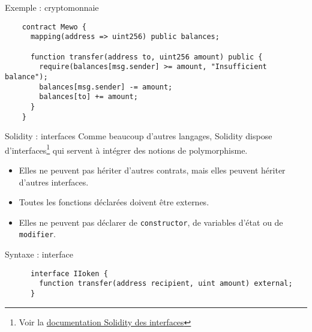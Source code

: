 \begin{frame}[fragile]{Exemple : cryptomonnaie}
  \begin{verbatim}
    contract Mewo {
      mapping(address => uint256) public balances;

      function transfer(address to, uint256 amount) public {
        require(balances[msg.sender] >= amount, "Insufficient balance");
        balances[msg.sender] -= amount;
        balances[to] += amount;
      }
    }
  \end{verbatim}
\end{frame}

\begin{frame}[fragile]{Solidity : interfaces}
  Comme beaucoup d'autres langages, Solidity dispose d'interfaces\footnote{Voir la \href{https://docs.soliditylang.org/fr/stable/contracts.html\#interfaces}{documentation Solidity des interfaces}} qui servent à intégrer des notions de polymorphisme.

  \begin{itemize}
    \item Elles ne peuvent pas hériter d'autres contrats, mais elles peuvent hériter d'autres interfaces.
    \item Toutes les fonctions déclarées doivent être externes.
    \item Elles ne peuvent pas déclarer de \texttt{constructor}, de variables d'état ou de \texttt{modifier}.
  \end{itemize}

  \begin{block}{Syntaxe : interface}
    \begin{verbatim}
      interface IIoken {
        function transfer(address recipient, uint amount) external;
      }
    \end{verbatim}
  \end{block}
\end{frame}

